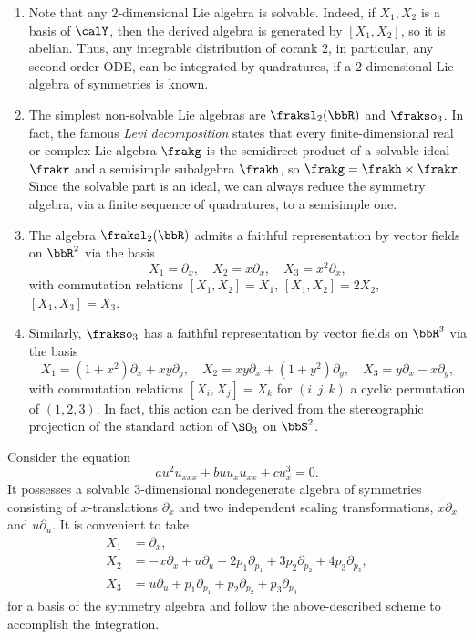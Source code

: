 \begin{example}
    \begin{enumerate}
        \item Note that any $2$-dimensional Lie algebra is solvable. Indeed, if $X_1,X_2$ is a basis of $\calY$, then the derived algebra is generated by $[X_1,X_2]$, so it is abelian. Thus, any integrable distribution of corank $2$, in particular, any second-order ODE, can be integrated by quadratures, if a $2$-dimensional Lie algebra of symmetries is known.
        \item The simplest non-solvable Lie algebras are $\fraksl_2(\bbR)$ and $\frakso_3$. In fact, the famous \emph{Levi decomposition} states that every finite-dimensional real or complex Lie algebra $\frakg$ is the semidirect product of a solvable ideal $\frakr$ and a semisimple subalgebra $\frakh$, so $\frakg=\frakh\ltimes\frakr$. Since the solvable part is an ideal, we can always reduce the symmetry algebra, via a finite sequence of quadratures, to a semisimple one.
        \item The algebra $\fraksl_2(\bbR)$ admits a faithful representation by vector fields on $\bbR^2$ via the basis 
        \[X_1=\partial_x,\quad X_2=x\partial_x,\quad X_3=x^2\partial_x,\]
        with commutation relations $[X_1,X_2]=X_1$, $[X_1,X_2]=2X_2$, $[X_1,X_3]=X_3$.
        \item Similarly, $\frakso_3$ has a faithful representation by vector fields on $\bbR^3$ via the basis 
        \[X_1=(1+x^2)\partial_x+xy\partial_y,\quad X_2=xy\partial_x+(1+y^2)\partial_y,\quad X_3=y\partial_x-x\partial_y,\]
        with commutation relations $[X_i,X_j]=X_k$ for $(i,j,k)$ a cyclic permutation of $(1,2,3)$. In fact, this action can be derived from the stereographic projection of the standard action of $\SO_3$ on $\bbS^2$.
    \end{enumerate}
\end{example}

\begin{example}
    Consider the equation 
    \[au^2u_{xxx}+buu_xu_{xx}+cu_x^3=0.\]
    It possesses a solvable $3$-dimensional nondegenerate algebra of symmetries consisting of $x$-translations $\partial_x$ and two independent scaling transformations, $x\partial_x$ and $u\partial_u$. It is convenient to take 
    \begin{align}
        X_1&=\partial_x,\\
        X_2&=-x\partial_x+u\partial_u+2p_1\partial_{p_1}+3p_2\partial_{p_2}+4p_3\partial_{p_3},\\
        X_3&=u\partial_u+p_1\partial_{p_1}+p_2\partial_{p_2}+p_3\partial_{p_3}
    \end{align} 
    for a basis of the symmetry algebra and follow the above-described scheme to accomplish the integration.
\end{example}


